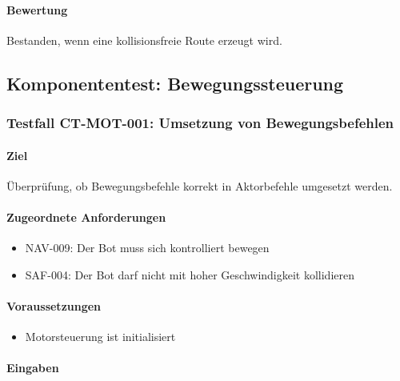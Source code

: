 \documentclass[
  a4paper,
  12pt,
  DIV=12,        %
  parskip=half,  %
  headings=small %
]{scrartcl}
\theoremstyle{definition}
\providecommand{\tightlist}{%
  \setlength{\itemsep}{0pt}\setlength{\parskip}{0pt}}
\theoremstyle{definition}
\begin{document}
\paragraph{Bewertung}\label{bewertung-3}

Bestanden, wenn eine kollisionsfreie Route erzeugt wird.

\subsection{Komponententest:
Bewegungssteuerung}\label{komponententest-bewegungssteuerung}

\subsubsection{Testfall CT-MOT-001: Umsetzung von
Bewegungsbefehlen}\label{testfall-ct-mot-001-umsetzung-von-bewegungsbefehlen}

\paragraph{Ziel}\label{ziel-4}

Überprüfung, ob Bewegungsbefehle korrekt in Aktorbefehle umgesetzt
werden.

\paragraph{Zugeordnete Anforderungen}\label{zugeordnete-anforderungen-4}

\begin{itemize}
\tightlist
\item
  NAV-009: Der Bot muss sich kontrolliert bewegen
\item
  SAF-004: Der Bot darf nicht mit hoher Geschwindigkeit kollidieren
\end{itemize}

\paragraph{Voraussetzungen}\label{voraussetzungen-4}

\begin{itemize}
\tightlist
\item
  Motorsteuerung ist initialisiert
\end{itemize}

\paragraph{Eingaben}\label{eingaben-4}
\end{document}
